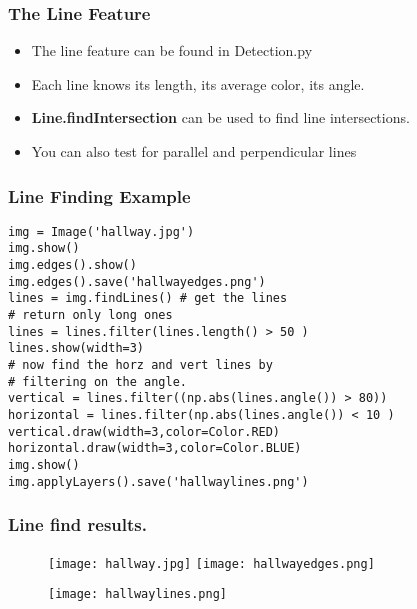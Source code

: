 \documentclass[compress]{beamer}
\begin{document}
\begin{frame}
  \frametitle{The Line Feature}
\begin{itemize}
\item The line feature can be found in Detection.py
\item Each line knows its length, its average color, its angle.
\item \textbf{Line.findIntersection} can be used to find line intersections.
\item You can also test for parallel and perpendicular lines
\end{itemize}
\end{frame}
\begin{frame}[fragile] 
\frametitle{Line Finding Example}
\begin{example}
\begin{verbatim}
img = Image('hallway.jpg')
img.show()
img.edges().show()
img.edges().save('hallwayedges.png')
lines = img.findLines() # get the lines
# return only long ones
lines = lines.filter(lines.length() > 50 )
lines.show(width=3)
# now find the horz and vert lines by 
# filtering on the angle.
vertical = lines.filter((np.abs(lines.angle()) > 80))
horizontal = lines.filter(np.abs(lines.angle()) < 10 )
vertical.draw(width=3,color=Color.RED)
horizontal.draw(width=3,color=Color.BLUE)
img.show()
img.applyLayers().save('hallwaylines.png')
\end{verbatim}
\end{example}
\end{frame} 
\begin{frame}
\frametitle{Line find results.}
 \begin{figure}
     \texttt{[image: hallway.jpg]}
     \quad
     \texttt{[image: hallwayedges.png]}
 \end{figure}
 \begin{figure}
     \texttt{[image: hallwaylines.png]}
 \end{figure}
\end{frame}
\end{document}
